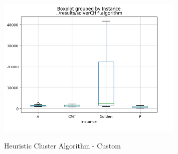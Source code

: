 \documentclass[12pt]{article}
\begin{document}
\begin{appendices}
\begin{figure}[!htb]
	\centering
	\caption{Heuristic Cluster Algorithm - Custom}{\includegraphics[width=0.8\textwidth]{solverCHH_algorithm_boxplot.png}\label{fig:Cluster_heuristic_fig}}
\end{figure}


\end{appendices}
\end{document}
